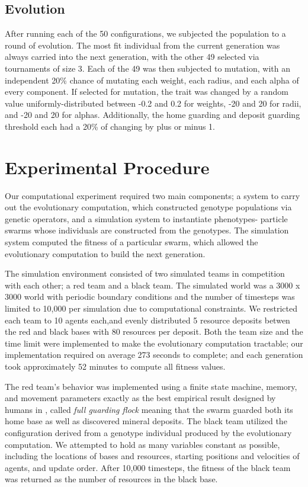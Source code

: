 \documentclass[12pt,journal,compsoc]{IEEEtran}
\begin{document}
\subsection{Evolution}

After running each of the 50 configurations, we subjected the population to a round of evolution. The most fit individual from the current generation was always carried into the next generation, with the other 49 selected via tournaments of size 3. Each of the 49 was then subjected to mutation, with an independent 20\% chance of mutating each weight, each radius, and each alpha of every component. If selected for mutation, the trait was changed by a random value uniformly-distributed between -0.2 and 0.2 for weights, -20 and 20 for radii, and -20 and 20 for alphas. Additionally, the home guarding and deposit guarding threshold each had a 20\% of changing by plus or minus 1.

\section{Experimental Procedure}

Our computational experiment required two main components; a system to carry out the evolutionary computation, which constructed genotype populations via genetic operators, and a simulation system to instantiate phenotypes- particle swarms whose individuals are constructed from the genotypes. The simulation system computed the fitness of a particular swarm, which allowed the evolutionary computation to build the next generation.

The simulation environment consisted of two simulated teams in competition with each other; a red team and a black team. The simulated world was a 3000 x 3000 world with periodic boundary conditions and the number of timesteps was limited to 10,000 per simulation due to computational constraints. We restricted each team to 10 agents each,and evenly distributed 5 resource deposits betwen the red and black bases with 80 resources per deposit. Both the team size and the time limit were implemented to make the evolutionary computation tractable; our implementation required on average 273 seconds to complete; and each generation took approximately 52 minutes to compute all fitness values.

The red team's behavior was implemented using a finite state machine, memory, and movement parameters exactly as the best empirical result designed by humans in \cite{rodriguez2004extending}, called \textit{full guarding flock} meaning that the swarm guarded both its home base as well as discovered mineral deposits. The black team utilized the configuration derived from a genotype individual produced by the evolutionary computation. We attempted to hold as many variables constant as possible, including the locations of bases and resources, starting positions and velocities of agents, and update order. After 10,000 timesteps, the fitness of the black team was returned as the number of resources in the black base.
\end{document}
